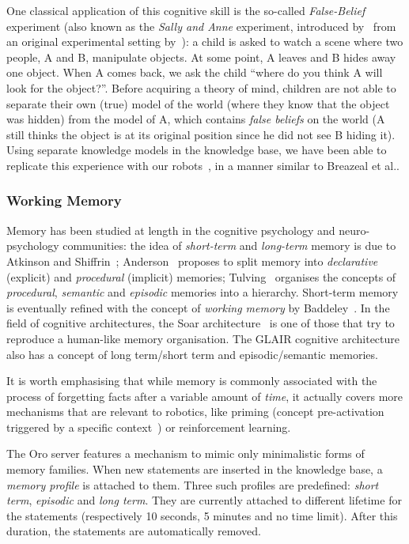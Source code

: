 \documentclass[preprint,3p,times]{elsarticle}
\newcommand{\etal}{et al.\xspace}
\begin{document}
One classical application of this cognitive skill is the so-called
\emph{False-Belief} experiment (also known as the \emph{Sally and Anne}
experiment, introduced by~\cite{wimmer1983beliefs} from an original
experimental setting by~\cite{baron1985does}): a child is asked to watch a scene where two
people, A and B, manipulate objects. At some point, A leaves and B hides away one
object. When A comes back, we ask the child ``where do you think A will
look for the object?''. Before acquiring a theory of mind, children are not
able to separate their own (true) model of the world (where they know that
the object was hidden) from the model of A, which contains \emph{false
beliefs} on the world (A still thinks the object is at its original
position since he did not see B hiding it). Using separate knowledge models
in the knowledge base, we have been able to replicate this experience with
our robots~\cite{warnier2012when}, in a manner similar to Breazeal
\etal\cite{breazeal2009embodied}.

\subsubsection{Working Memory}
\label{memory}

Memory has been studied at length in the cognitive psychology and
neuro-psychology communities: the idea of \emph{short-term} and \emph{long-term}
memory is due to Atkinson and Shiffrin~\cite{Atkinson1968};
Anderson~\cite{Anderson1976} proposes to split memory into \emph{declarative}
(explicit) and \emph{procedural} (implicit) memories; Tulving~\cite{Tulving1985}
organises the concepts of \emph{procedural}, \emph{semantic} and \emph{episodic}
memories into a hierarchy. Short-term memory is eventually refined with the
concept of \emph{working memory} by Baddeley~\cite{Baddeley2010}.  In the field
of cognitive architectures, the {\sc Soar} architecture~\cite{Lehman2006} is one
of those that try to reproduce a human-like memory organisation. The GLAIR
cognitive architecture~\cite{Shapiro2009} also has a concept of long term/short
term and episodic/semantic memories.

It is worth emphasising that while memory is commonly associated with the process of
forgetting facts after a variable amount of \emph{time}, it actually covers
more mechanisms that are relevant to robotics, like priming
(concept pre-activation triggered by a specific
context~\cite{baxter2012modelling}) or reinforcement learning.

The {\sc Oro} server features a mechanism to mimic only minimalistic forms of memory
families.  When new statements are inserted in the knowledge base, a
\emph{memory profile} is attached to them.  Three such profiles are
predefined: {\it short term}, {\it episodic} and {\it long term}. They are
currently attached to different lifetime for the statements (respectively 10
seconds, 5 minutes and no time limit). After this duration, the statements are
automatically removed.
\end{document}
